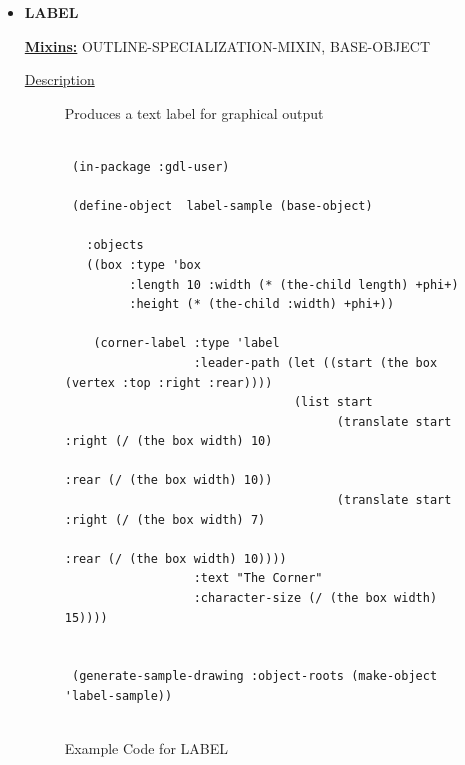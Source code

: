 \documentclass [11pt]{book}
\begin{document}
\begin{itemize}
\item {}
\label{prim:label}
\textbf{LABEL}


\textbf{
\underline{Mixins:}} OUTLINE-SPECIALIZATION-MIXIN, BASE-OBJECT





\begin{description}

\item [
\underline{Description}]


Produces a text label for graphical output



\end{description}




\begin{figure}
\begin{lrbox}{\boxedverb}
\begin{minipage}{\linewidth}
{\small

\begin{verbatim}        

 (in-package :gdl-user)
                   
 (define-object  label-sample (base-object)
  
   :objects
   ((box :type 'box
         :length 10 :width (* (the-child length) +phi+)
         :height (* (the-child :width) +phi+))
   
    (corner-label :type 'label
                  :leader-path (let ((start (the box (vertex :top :right :rear))))
                                (list start
                                      (translate start :right (/ (the box width) 10)
                                                       :rear (/ (the box width) 10))
                                      (translate start :right (/ (the box width) 7)
                                                       :rear (/ (the box width) 10))))
                  :text "The Corner"
                  :character-size (/ (the box width) 15))))


 (generate-sample-drawing :object-roots (make-object 'label-sample))


\end{verbatim}}
\end{minipage}
\end{lrbox}
\fbox{\usebox{\boxedverb}}

\caption{Example Code for LABEL}

\label{fig:example-code-LABEL}


\end{figure}
\end{itemize}
\end{document}
